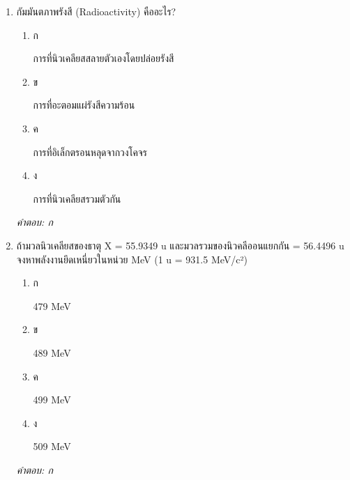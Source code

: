 \documentclass[12pt]{article}
\begin{document}
\begin{enumerate}[label=\arabic*., itemsep=0.5\baselineskip, topsep=0.5\baselineskip, leftmargin=*]
\item กัมมันตภาพรังสี (Radioactivity) คืออะไร?
\begin{enumerate}[label=\alph*)., itemsep=0.3\baselineskip, topsep=0.3\baselineskip]
\item ก\ 
\begin{minipage}[t]{0.9\linewidth}
\raggedright การที่นิวเคลียสสลายตัวเองโดยปล่อยรังสี
\end{minipage}
\item ข\ 
\begin{minipage}[t]{0.9\linewidth}
\raggedright การที่อะตอมแผ่รังสีความร้อน
\end{minipage}
\item ค\ 
\begin{minipage}[t]{0.9\linewidth}
\raggedright การที่อิเล็กตรอนหลุดจากวงโคจร
\end{minipage}
\item ง\ 
\begin{minipage}[t]{0.9\linewidth}
\raggedright การที่นิวเคลียสรวมตัวกัน
\end{minipage}
\end{enumerate}
\vspace{-0.3\baselineskip}
\begin{small}
\textit{คำตอบ: ก}
\end{small}

\item ถ้ามวลนิวเคลียสของธาตุ X = 55.9349 u และมวลรวมของนิวคลีออนแยกกัน = 56.4496 u จงหาพลังงานยึดเหนี่ยวในหน่วย MeV (1 u = 931.5 MeV/c²)
\begin{enumerate}[label=\alph*)., itemsep=0.3\baselineskip, topsep=0.3\baselineskip]
\item ก\ 
\begin{minipage}[t]{0.9\linewidth}
\raggedright 479 MeV
\end{minipage}
\item ข\ 
\begin{minipage}[t]{0.9\linewidth}
\raggedright 489 MeV
\end{minipage}
\item ค\ 
\begin{minipage}[t]{0.9\linewidth}
\raggedright 499 MeV
\end{minipage}
\item ง\ 
\begin{minipage}[t]{0.9\linewidth}
\raggedright 509 MeV
\end{minipage}
\end{enumerate}
\vspace{-0.3\baselineskip}
\begin{small}
\textit{คำตอบ: ก}
\end{small}


\end{enumerate}
\end{document}
